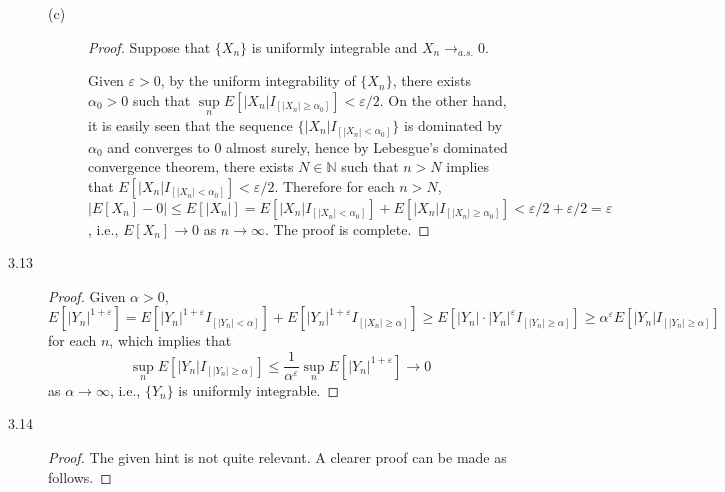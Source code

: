 \documentclass{article}
\newcommand{\eps}{\varepsilon}
\newcommand{\nn}{\mathbb{N}}
\theoremstyle{definition}
\theoremstyle{plain}
\theoremstyle{remark}
\begin{document}
\begin{description}
\begin{description}
\item[(c)]
\begin{proof}
Suppose that $\{X_n\}$ is uniformly integrable and $X_n \to_{a.s.} 0$. 

Given $\eps > 0$, by the uniform integrability of $\{X_n\}$, there exists $\alpha_0 > 0$ such that $\sup\limits_n E[|X_n|I_{[|X_n| \geq \alpha_0]}] < \eps/2$. On the other hand, it is easily seen that the sequence $\{|X_n|I_{[|X_n| < \alpha_0]}\}$ is dominated by $\alpha_0$ and converges to $0$ almost surely, hence by Lebesgue's dominated convergence theorem, there exists $N \in \nn$ such that $n > N$ implies that $E[|X_n|I_{[|X_n| < \alpha_0]}] < \eps/2$. Therefore for each $n > N$, $|E[X_n] - 0| \leq E[|X_n|] = E[|X_n|I_{[|X_n| < \alpha_0]}] + E[|X_n|I_{[|X_n| \geq \alpha_0]}] < \eps/2 + \eps/2 = \eps$, i.e., $E[X_n] \to 0$ as $n \to \infty$. The proof is complete. 
\end{proof}
\end{description}

\item[3.13]
\begin{proof}
Given $\alpha > 0$, $E[|Y_n|^{1 + \eps}] =  E[|Y_n|^{1 + \eps}I_{[|Y_n| < \alpha]}] + E[|Y_n|^{1 + \eps}I_{[|X_n| \geq \alpha]}] \geq E[|Y_n| \cdot |Y_n|^\eps I_{[|Y_n| \geq \alpha]}] \geq \alpha^\eps E[|Y_n|I_{[|Y_n| \geq \alpha]}]$ for each $n$, which implies that 
$$\sup_n E[|Y_n|I_{[|Y_n| \geq \alpha]}] \leq \frac{1}{\alpha^\eps} \sup_n E[|Y_n|^{1 + \eps}] \to 0$$
as $\alpha \to \infty$, i.e., $\{Y_n\}$ is uniformly integrable. 
\end{proof}

\item[3.14]
\begin{proof}
The given hint is not quite relevant. A clearer proof can be made as follows.


\end{proof}
\end{description}
\end{document}
